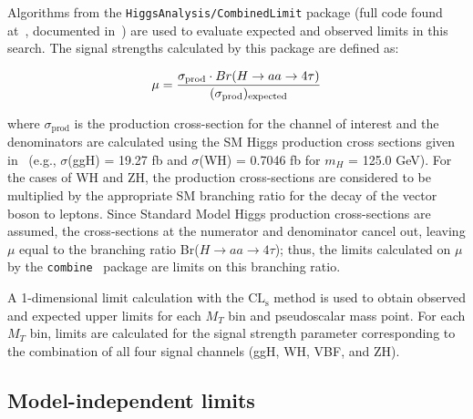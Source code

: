 Algorithms from the \texttt{HiggsAnalysis/CombinedLimit} package (full code found at~\cite{CombinedGitHub}, documented in~\cite{CombinedTwiki}) are used to evaluate expected and observed limits in this search. The signal strengths calculated by this package are defined as:

\begin{equation}
\mu = \frac{\sigma_{\text{prod}}\cdot Br(H\rightarrow aa \rightarrow4\tau)}{(\sigma_{\text{prod}})_{\text{expected}}} \\
\label{eq:rDefinition}
\end{equation}

where $\sigma_{\text{prod}}$ is the production cross-section for the channel of interest and the denominators are calculated using the SM Higgs production cross sections given in~\cite{LHCHXSWG} (e.g., $\sigma$(ggH) = 19.27 fb and $\sigma$(WH) = 0.7046 fb for $m_{H}$ = 125.0 GeV). For the cases of WH and ZH, the production cross-sections are considered to be multiplied by the appropriate SM branching ratio for the decay of the vector boson to leptons. Since Standard Model Higgs production cross-sections are assumed, the cross-sections at the numerator and denominator cancel out, leaving $\mu$ equal to the branching ratio Br($H\rightarrow$$aa$$\rightarrow4\tau$); thus, the limits calculated on $\mu$ by the \texttt{combine}~\cite{springerlink:10.1140/epjc/s10052-011-1554-0} package are limits on this branching ratio.

A 1-dimensional limit calculation with the $\text{CL}_{\text{s}}$ method is used to obtain observed and expected upper limits for each $M_{T}$ bin and pseudoscalar mass point. For each $M_{T}$ bin, limits are calculated for the signal strength parameter corresponding to the combination of all four signal channels (ggH, WH, VBF, and ZH).

\subsection{Model-independent limits\label{sec:results-limits}}

